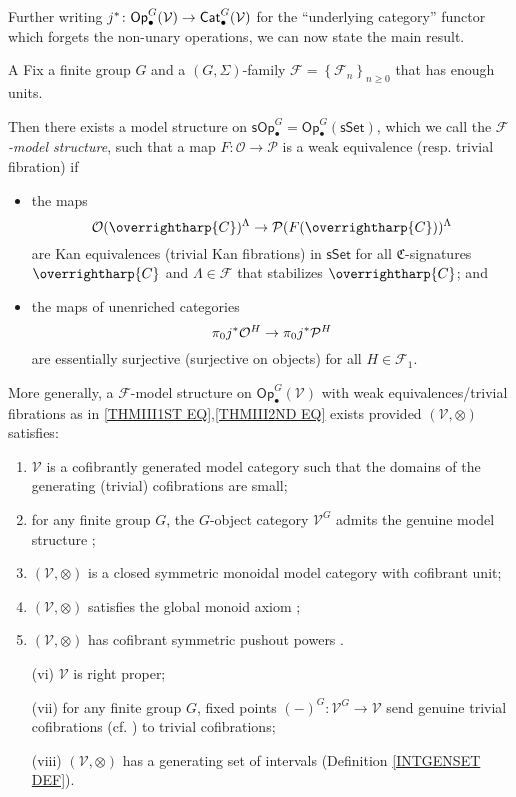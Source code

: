 \documentclass[a4paper,10pt
 ,final
]{article}%
\numberwithin{equation}{section}
\numberwithin{figure}{section}
\theoremstyle{definition} %
\newcommand{\set}[1]{\left\{#1\right\}}%
\newcommand{\vect}[1]{\text{\overrightharp{\ensuremath{#1}}}}
\newcommand{\Op}{\mathsf{Op}}%
\newcommand{\F}{\ensuremath{\mathcal F}}
\newcommand{\V}{\ensuremath{\mathcal V}}
\renewcommand{\O}{\ensuremath{\mathcal O}}
\newcommand{\1}{\ensuremath{\mathbbm 1}}%
\begin{document}
Further writing
$j^{\**} \colon 
\mathsf{Op}^G_{\bullet}(\V) \to \mathsf{Cat}^G_{\bullet}(\V)$
for the ``underlying category''
functor which forgets the non-unary operations,
we can now state the main result.


\begin{customthm}{A}\label{THMA}
Fix a finite group $G$ 
and a $(G,\Sigma)$-family $\F = \set{\F_n}_{n \geq 0}$
that has enough units.

Then there exists a model structure on
$\mathsf{sOp}^G_{\bullet} = 
\mathsf{Op}^G_{\bullet}(\mathsf{sSet})$,
which we call the \emph{$\F$-model structure},
such that a map
$F\colon \mathcal{O} \to \mathcal{P}$
is a weak equivalence (resp. trivial fibration) if
\begin{itemize}
\item the maps
\begin{equation}\label{THMIII1ST EQ}
	\O(\vect{C})^{\Lambda} \to \mathcal{P}(F(\vect{C}))^{\Lambda}
\end{equation}
are Kan equivalences (trivial Kan fibrations)
in $\mathsf{sSet}$
for all $\mathfrak{C}$-signatures $\vect{C}$
and $\Lambda \in \F$ that stabilizes $\vect{C}$; and
\item 
the maps of unenriched categories
\begin{equation}\label{THMIII2ND EQ}
\pi_0 j^{\**} \O^H 
\to 
\pi_0 j^{\**} \mathcal{P}^H 
\end{equation}
are essentially surjective (surjective on objects)
for all $H \in \F_1$.
\end{itemize}
More generally, a $\F$-model structure on 
$\Op^G_{\bullet}(\V)$
with weak equivalences/trivial fibrations as in 
\eqref{THMIII1ST EQ},\eqref{THMIII2ND EQ}
exists provided $(\V,\otimes)$ satisfies:
\begin{enumerate}[label = (\roman*)]
	\item $\V$ is a cofibrantly generated model category
	such that the domains of the generating (trivial) cofibrations are small;
	\item for any finite group $G$, the $G$-object category $\V^G$ admits the genuine model structure 
	\cite[Def. \ref{OC-GENMOD DEF}]{BP_FCOP};
	\item $(\V, \otimes)$ is a closed symmetric monoidal model category with cofibrant unit;
	\item $(\V, \otimes)$ satisfies the global monoid axiom \cite[Def. \ref{OC-GLOBMONAX_DEF}]{BP_FCOP};
	\item $(\V, \otimes)$ has cofibrant symmetric pushout powers \cite[Def. \ref{OC-CSPP_DEF}]{BP_FCOP}.
	\item[(vi)] $\V$ is right proper;
	\item[(vii)]
	for any finite group $G$, fixed points
	$(-)^{G} \colon \V^G \to \V$
	send genuine trivial cofibrations 
	(cf. \cite[Def. \ref{OC-GENMOD DEF}]{BP_FCOP})
	to trivial cofibrations;
	\item[(viii)] $(\V, \otimes)$ has a generating set of intervals
	(Definition \ref{INTGENSET DEF}).
\end{enumerate}
\end{customthm}
\end{document}
